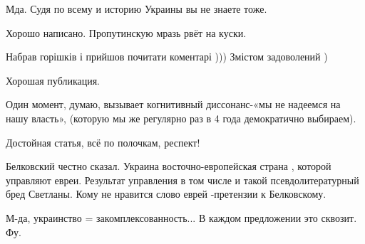 \begin{itemize}
Мда. Судя по всему и историю Украины вы не знаете тоже.

 
Хорошо написано. Пропутинскую мразь рвёт на куски.

 

Набрав горішків і прийшов почитати коментарі ))) Змістом задоволений )

 

Хорошая публикация.

Один момент, думаю, вызывает когнитивный диссонанс-«мы не надеемся на нашу
власть», (которую мы же регулярно раз в 4 года демократично выбираем).

Достойная статья, всё по полочкам, респект!

 

Белковский честно сказал. Украина восточно-европейская страна , которой
управляют евреи. Результат управления в том числе и такой псевдолитературный
бред Светланы. Кому не нравится слово еврей -претензии к Белковскому.

 
М-да, украинство = закомплексованность... В каждом предложении это сквозит. Фу.

 

\end{itemize}
